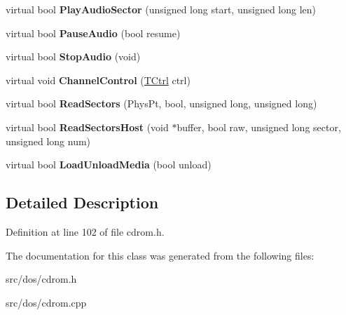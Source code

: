 \begin{DoxyCompactItemize}
\item 
\hypertarget{classCDROM__Interface__SDL_a1ab19753917b3fd97a28cec1191d84aa}{virtual bool {\bfseries Play\-Audio\-Sector} (unsigned long start, unsigned long len)}\label{classCDROM__Interface__SDL_a1ab19753917b3fd97a28cec1191d84aa}

\item 
\hypertarget{classCDROM__Interface__SDL_a05e05542290e98ba8dc41fb3fc75f363}{virtual bool {\bfseries Pause\-Audio} (bool resume)}\label{classCDROM__Interface__SDL_a05e05542290e98ba8dc41fb3fc75f363}

\item 
\hypertarget{classCDROM__Interface__SDL_ad6d548854bf1bac17204f67b8f1dbe40}{virtual bool {\bfseries Stop\-Audio} (void)}\label{classCDROM__Interface__SDL_ad6d548854bf1bac17204f67b8f1dbe40}

\item 
\hypertarget{classCDROM__Interface__SDL_a36747451cf2e7d18400fd5716947bca4}{virtual void {\bfseries Channel\-Control} (\hyperlink{structSCtrl}{T\-Ctrl} ctrl)}\label{classCDROM__Interface__SDL_a36747451cf2e7d18400fd5716947bca4}

\item 
\hypertarget{classCDROM__Interface__SDL_ae7079bbd9e22a19d2983ff4689cb914b}{virtual bool {\bfseries Read\-Sectors} (Phys\-Pt, bool, unsigned long, unsigned long)}\label{classCDROM__Interface__SDL_ae7079bbd9e22a19d2983ff4689cb914b}

\item 
\hypertarget{classCDROM__Interface__SDL_abe1fa6a654007a16c3d6d5423c69bfbe}{virtual bool {\bfseries Read\-Sectors\-Host} (void $\ast$buffer, bool raw, unsigned long sector, unsigned long num)}\label{classCDROM__Interface__SDL_abe1fa6a654007a16c3d6d5423c69bfbe}

\item 
\hypertarget{classCDROM__Interface__SDL_ae018393018fac0937b375dce79e31d0e}{virtual bool {\bfseries Load\-Unload\-Media} (bool unload)}\label{classCDROM__Interface__SDL_ae018393018fac0937b375dce79e31d0e}

\end{DoxyCompactItemize}


\subsection{Detailed Description}


Definition at line 102 of file cdrom.\-h.



The documentation for this class was generated from the following files\-:\begin{DoxyCompactItemize}
\item 
src/dos/cdrom.\-h\item 
src/dos/cdrom.\-cpp\end{DoxyCompactItemize}
